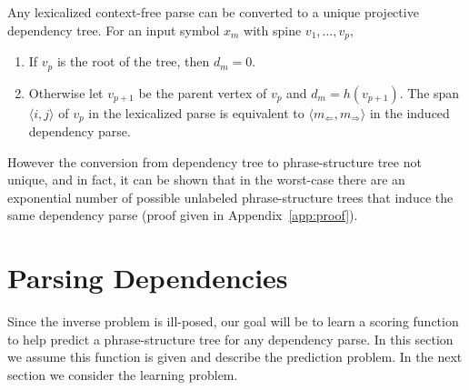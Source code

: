 \documentclass[11pt,letterpaper]{article}
\newcommand{\Left}[1]{#1_{\Leftarrow}}
\newcommand{\Right}[1]{#1_{\Rightarrow}}
\newcommand{\Span}[1]{\langle #1 \rangle}
\begin{document}
Any lexicalized context-free parse can be converted to a unique projective dependency tree.
For an input symbol $x_m$ with spine $v_1, \ldots, v_p$,

\begin{enumerate}
\item If $v_p$ is the root of the tree,
then $d_m = 0$.
\item Otherwise let $v_{p+1}$ be the parent vertex of
$v_p$ and $d_m = h(v_{p+1})$. The span $\Span{i, j}$ of $v_p$ in the lexicalized parse is equivalent to $\Span{\Left{m}, \Right{m}}$
in the induced dependency parse.
\end{enumerate}


However the conversion from dependency tree to phrase-structure tree not unique, and in fact, it can be shown that in the worst-case there are an
exponential number of possible unlabeled phrase-structure trees that induce the same dependency parse (proof given in Appendix~\ref{app:proof}).


\section{Parsing Dependencies}

Since the inverse problem is ill-posed, our goal will
be to learn a scoring function to help predict a
phrase-structure tree for any dependency parse. In
this section we assume this function is given and describe
the prediction problem. In the next section we consider
the learning problem.
\end{document}
